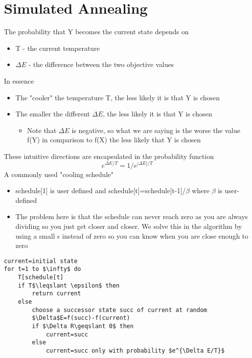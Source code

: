 \documentclass{article}[18pt]
\begin{document}
\section{Simulated Annealing}
The probability that Y becomes the current state depends on
\begin{itemize}
	\item T - the current temperature
	\item $\Delta E$ - the difference between the two objective values
\end{itemize}
In essence
\begin{itemize}
	\item The "cooler" the temperature T, the less likely it is that Y is chosen
	\item The smaller the different $\Delta E$, the less likely it is that Y is chosen
	\begin{itemize}
		\item Note that $\Delta E$ is negative, so what we are saying is the worse the value f(Y) in comparison to f(X) the less likely that Y is chosen
	\end{itemize}
\end{itemize}
These intuitive directions are encapsulated in the probability function
{\Large
$$e^{\Delta E/T}=1/e^{|\Delta E|/T}$$
}
A commonly used "cooling schedule"
\begin{itemize}
	\item schedule[1] is user defined and schedule[t]=schedule[t-1]/$\beta$ where $\beta$ is user-defined
	\item The problem here is that the schedule can never reach zero as you are always dividing so you just get closer and closer. We solve this in the algorithm by using a small $\epsilon$ instead of zero so you can know when you are close enough to zero
\end{itemize}
\begin{lstlisting}[caption=Simulated-annealing]
current=initial state
for t=1 to $\infty$ do
	T[schedule[t]
	if T$\leqslant \epsilon$ then
		return current
	else
		choose a successor state succ of current at random
		$\Delta$E=f(succ)-f(current)
		if $\Delta R\geqslant 0$ then
			current=succ
		else
			current=succ only with probability $e^{\Delta E/T}$
\end{lstlisting}
\end{document}
